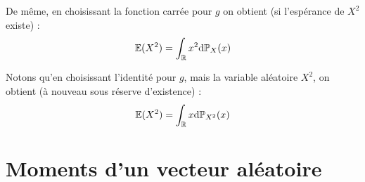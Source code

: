 \documentclass[../integ-proba.tex]{subfiles}
\begin{document}
    \begin{exemple}
        De même, en choisissant la fonction carrée pour $g$ on obtient (si l'espérance de $X^2$ existe) :
        \begin{displaymath}
            \mathbb{E}(X^2) = \int_{\mathbb{R}} x^2\textnormal{d}\mathbb{P}_X(x)
        \end{displaymath}

        Notons qu'en choisissant l'identité pour $g$, mais la variable aléatoire $X^2$, on obtient (à nouveau sous réserve d'existence) :
        \begin{displaymath}
            \mathbb{E}(X^2) = \int_\mathbb{R} x\textnormal{d}\mathbb{P}_{X^2}(x)
        \end{displaymath}
    \end{exemple}

    \section{Moments d'un vecteur aléatoire}
\end{document}
